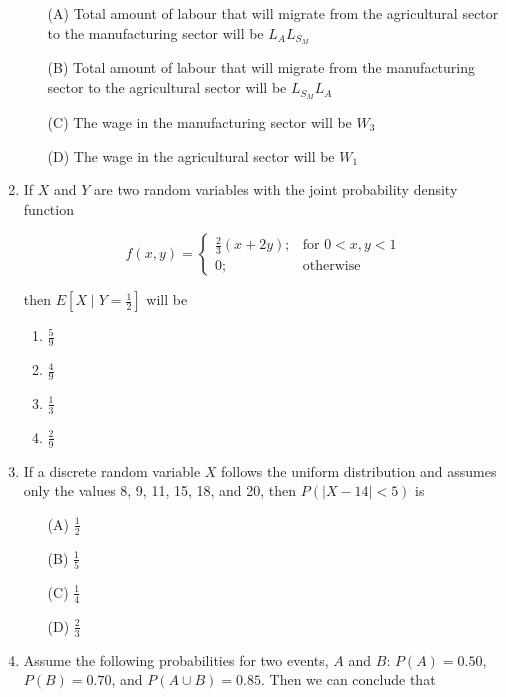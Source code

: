 \documentclass[journal,12pt,onecolumn]{exam}
\theoremstyle{remark}
\begin{document}
\begin{enumerate}
\begin{enumerate}
    \item[(A)] Total amount of labour that will migrate from the agricultural sector to the manufacturing sector will be \(L_A L_{S_M}\)
    \item[(B)] Total amount of labour that will migrate from the manufacturing sector to the agricultural sector will be \(L_{S_M} L_A\)
    \item[(C)] The wage in the manufacturing sector will be \(W_3\)
    \item[(D)] The wage in the agricultural sector will be \(W_1\)
\end{enumerate}

\item If \(X\) and \(Y\) are two random variables with the joint probability density function

\[
f(x,y) = \begin{cases}
\frac{2}{3}(x + 2y); & \text{for } 0 < x, y < 1 \\
0; & \text{otherwise}
\end{cases}
\]

then \(E\left[ X \mid Y = \frac{1}{2} \right]\) will be

\begin{enumerate}
    \item \(\frac{5}{9}\)
    \item \(\frac{4}{9}\)
    \item \(\frac{1}{3}\)
    \item \(\frac{2}{9}\)
\end{enumerate}

\item If a discrete random variable \(X\) follows the uniform distribution and assumes only the values 8, 9, 11, 15, 18, and 20, then \(P(|X - 14| < 5)\) is

\begin{enumerate}
    \item[(A)] \(\frac{1}{2}\)
    \item[(B)] \(\frac{1}{5}\)
    \item[(C)] \(\frac{1}{4}\)
    \item[(D)] \(\frac{2}{3}\)
\end{enumerate}

\item Assume the following probabilities for two events, \(A\) and \(B\): \(P(A) = 0.50\), \(P(B) = 0.70\), and \(P(A \cup B) = 0.85\). Then we can conclude that


\end{enumerate}
\end{document}
